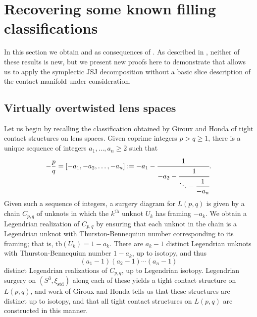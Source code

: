 \documentclass[11pt]{amsart}
\numberwithin{equation}{section}
\theoremstyle{plain}
\theoremstyle{definition}
\theoremstyle{remark}\newtheorem{rem}[equation]{Remark}%
\theoremstyle{remark}\newtheorem{obs}[equation]{Observation}%
\begin{document}
\section{Recovering some known filling classifications}\label{sec:known-results-proofs}

In this section we obtain  and  as consequences of .  As described in , neither of these results is new, but we present new proofs here to demonstrate that  allows us to apply the symplectic JSJ decomposition without a basic slice description of the contact manifold under consideration. 

\subsection{Virtually overtwisted lens spaces}\label{subsec:known-results:lens-spaces}

Let us begin by recalling the classification obtained by Giroux \cite{giroux2000structures} and Honda \cite{honda2000classification} of tight contact structures on lens spaces.  Given coprime integers $p>q\geq 1$, there is a unique sequence of integers $a_1,\ldots,a_n\geq 2$ such that
\[
-\dfrac{p}{q} = [-a_1,-a_2,\ldots,-a_n] := -a_1-\cfrac{1}{-a_2-\cfrac{1}{\ddots-\cfrac{1}{-a_n}}}.
\]
Given such a sequence of integers, a surgery diagram for $L(p,q)$ is given by a chain $C_{p,q}$ of unknots in which the $k^{\mathrm{th}}$ unknot $U_k$ has framing $-a_k$.  We obtain a Legendrian realization of $C_{p,q}$ by ensuring that each unknot in the chain is a Legendrian unknot with Thurston-Bennequiun number corresponding to its framing; that is, $\mathrm{tb}(U_k)=1-a_k$.  There are $a_k-1$ distinct Legendrian unknots with Thurston-Bennequiun number $1-a_k$, up to isotopy, and thus
\[
(a_1-1)(a_2-1)\cdots(a_n-1)
\]
distinct Legendrian realizations of $C_{p,q}$, up to Legendrian isotopy.  Legendrian surgery on $(S^3,\xi_{\mathrm{std}})$ along each of these yields a tight contact structure on $L(p,q)$, and work of Giroux \cite{giroux2000structures} and Honda \cite{honda2000classification} tells us that these structures are distinct up to isotopy, and that all tight contact structures on $L(p,q)$ are constructed in this manner.
\end{document}
